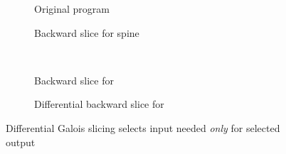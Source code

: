 \begin{figure}
   \small
   \begin{centering}
      \begin{subfigure}{0.45\textwidth}
         {}
      \caption{Original program}
      \label{fig:example:diff-slicing:original}
   \end{subfigure}
      \begin{subfigure}{0.45\textwidth}
         {}
      \caption{Backward slice for spine \kw{($\hole$, $\hole$)}}
      \label{fig:example:diff-slicing:spine}
      \end{subfigure}
      \\
      \begin{subfigure}{0.45\textwidth}
         {}
      \caption{Backward slice for }
      \label{fig:example:diff-slicing:subtree}
      \end{subfigure}
      \begin{subfigure}{0.45\textwidth}
         {}
      \caption{Differential backward slice for }
      \label{fig:example:diff-slicing:differential}
      \end{subfigure}
   \end{centering}
   \caption{Differential Galois slicing selects input needed \emph{only} for selected output}
   \label{fig:example:diff-slicing}
\end{figure}
